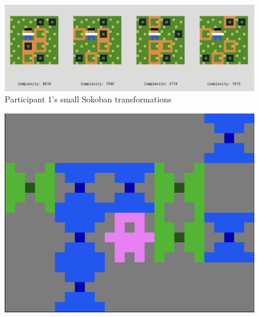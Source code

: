 \begin{description}
    
    \begin{figure}
\centering
\includegraphics[width=\textwidth]{figures/part1_smallsokobandesigns.png}
\caption{Participant 1's small Sokoban transformations \label{fig:part1smallsokoban}}
\end{figure}


\begin{figure}
\centering
\begin{minipage}[t]{0.3\textwidth}
\includegraphics[width=\textwidth]{figures/part1AllGreenToBlue.png} \\
\end{minipage}


\end{figure}
\end{description}

